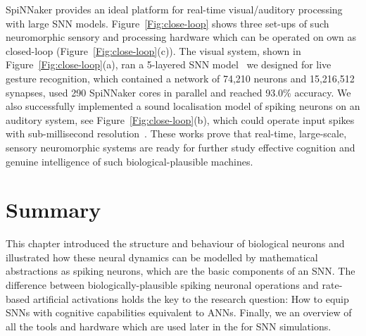 SpiNNaker provides an ideal platform for real-time visual/auditory processing with large SNN models.
Figure~\ref{Fig:close-loop} shows three set-ups of such \protect{} \protect{} neuromorphic sensory and processing hardware \protect{} \protect{} which can be operated on \protect{} \protect{} own as \protect{} closed-loop \protect{} \protect{} (Figure~\ref{Fig:close-loop}(c)).
The visual system, shown in Figure~\ref{Fig:close-loop}(a), ran a 5-layered SNN model~\citep{liu2014real} we designed for live gesture recognition, which contained a network of 74,210 neurons and 15,216,512 synapses, used \protect{} 290 SpiNNaker cores in parallel and reached 93.0\% accuracy. 
We also successfully implemented a sound localisation model of spiking neurons on an auditory system, see Figure~\ref{Fig:close-loop}(b), which could operate \protect{} input spikes with sub-millisecond resolution~\citep{lagorce2015breaking}.
These works prove that real-time, large-scale, sensory neuromorphic systems are ready for further study \protect{} \protect{} effective cognition and \protect{} genuine intelligence \protect{} of such biological-plausible machines.

\section{Summary}
This chapter introduced the structure and behaviour of biological neurons and illustrated how these neural dynamics can be modelled by mathematical abstractions as spiking neurons, which are the basic components of an SNN.
The difference between biologically-plausible spiking neuronal operations and rate-based artificial activations holds the key to the research question: How to equip SNNs with cognitive capabilities equivalent to ANNs.
Finally, we \protect{} \protect{} an overview of all the tools and hardware \protect{} \protect{} which are used later in the \protect{} \protect{} for SNN simulations.
